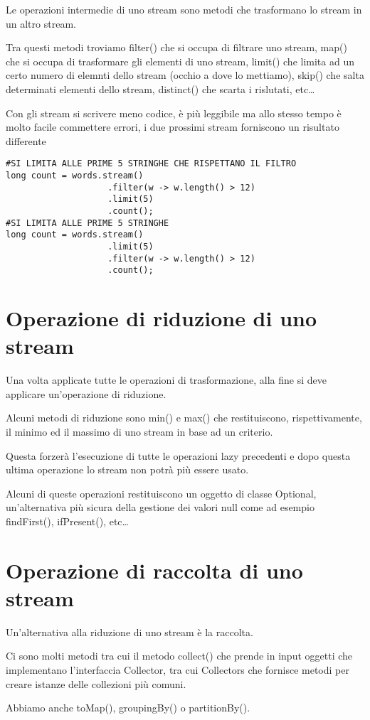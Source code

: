 Le operazioni intermedie di uno stream sono metodi che trasformano lo stream in un altro stream.

Tra questi metodi troviamo filter() che si occupa di filtrare uno stream, map() che si occupa di trasformare gli elementi di uno stream, limit() che limita ad un
certo numero di elemnti dello stream (occhio a dove lo mettiamo), skip() che salta determinati elementi dello stream, distinct() che scarta i rislutati, etc\dots

Con gli stream si scrivere meno codice, è più leggibile ma allo stesso tempo è molto facile commettere errori, i due prossimi stream forniscono un risultato differente

\begin{lstlisting}
#SI LIMITA ALLE PRIME 5 STRINGHE CHE RISPETTANO IL FILTRO
long count = words.stream()
                    .filter(w -> w.length() > 12)
                    .limit(5)
                    .count();
#SI LIMITA ALLE PRIME 5 STRINGHE                    
long count = words.stream()
                    .limit(5)
                    .filter(w -> w.length() > 12)
                    .count();
\end{lstlisting}

\section{Operazione di riduzione di uno stream}

Una volta applicate tutte le operazioni di trasformazione, alla fine si deve applicare un’operazione di riduzione.

Alcuni metodi di riduzione sono min() e max() che restituiscono, rispettivamente, il minimo ed il massimo di uno stream in base ad un criterio.

Questa forzerà l’esecuzione di tutte le operazioni lazy precedenti e dopo questa ultima operazione lo stream non potrà più essere usato.

Alcuni di queste operazioni restituiscono un oggetto di classe Optional, un’alternativa più sicura della gestione dei valori null come ad esempio findFirst(), 
ifPresent(), etc\dots



\section{Operazione di raccolta di uno stream}

Un'alternativa alla riduzione di uno stream è la raccolta.

Ci sono molti metodi tra cui il metodo collect() che prende in input oggetti che implementano l'interfaccia Collector, tra cui Collectors che fornisce metodi 
per creare istanze delle collezioni più comuni.

Abbiamo anche toMap(), groupingBy() o partitionBy().


